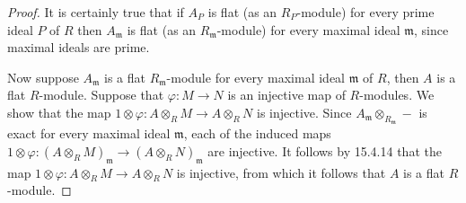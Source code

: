 \documentclass[11pt]{article}
\begin{document}
\begin{enumerate}
\begin{proof}
        It is certainly true that if $A_P$ is flat (as an $R_P$-module) for every prime ideal $P$ of $R$ then $A_{\mathfrak m}$ is flat (as an $R_{\mathfrak m}$-module) for every maximal ideal $\mathfrak m$, since maximal ideals are prime.
        
        Now suppose $A_{\mathfrak m}$ is a flat $R_{\mathfrak m}$-module for every maximal ideal $\mathfrak m$ of $R$, then $A$ is a flat $R$-module. Suppose that $\varphi\colon M\to N$ is an injective map of $R$-modules. We show that the map $1\otimes \varphi\colon A\otimes_R M\to A\otimes_R N$ is injective. Since $A_{\mathfrak m}\otimes_{R_{\mathfrak m}} -$ is exact for every maximal ideal $\mathfrak m$, each of the induced maps $1\otimes \varphi\colon (A\otimes_R M)_{\mathfrak m}\to (A\otimes_R N)_{\mathfrak m}$ are injective. It follows by 15.4.14 that the map $1\otimes \varphi\colon A\otimes_R M\to A\otimes_R N$ is injective, from which it follows that $A$ is a flat $R$-module.
    \end{proof}
\end{enumerate}
\end{document}
